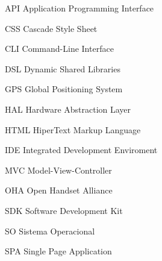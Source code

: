 \begin{siglas}
  
  \item[API] Application Programming Interface
  \item[CSS] Cascade Style Sheet
  \item[CLI] Command-Line Interface
  \item[DSL] Dynamic Shared Libraries
  \item[GPS] Global Positioning System
  \item[HAL] Hardware Abstraction Layer
  \item[HTML] HiperText Markup Language
  \item[IDE] Integrated Development Enviroment
  \item[MVC] Model-View-Controller
  \item[OHA] Open Handset Alliance
  \item[SDK] Software Development Kit
  \item[SO] Sistema Operacional
  \item[SPA] Single Page Application
    
\end{siglas}
